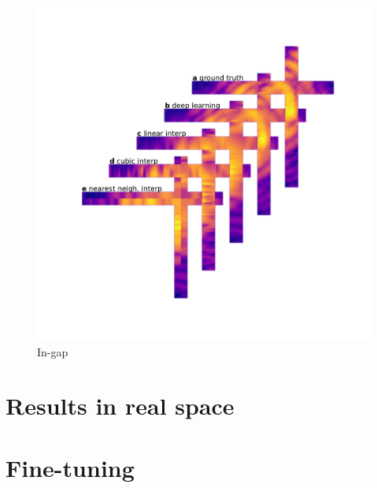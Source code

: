 \begin{figure}[h]
    \centering
    \includegraphics[width=\textwidth]{figures/Inpainting/cross_interp.pdf}
    \caption{In-gap}
    \label{fig:cross_interp}
\end{figure}

\section{Results in real space}\label{sec:res_real}
\section{Fine-tuning}\label{sec:finetuning}


